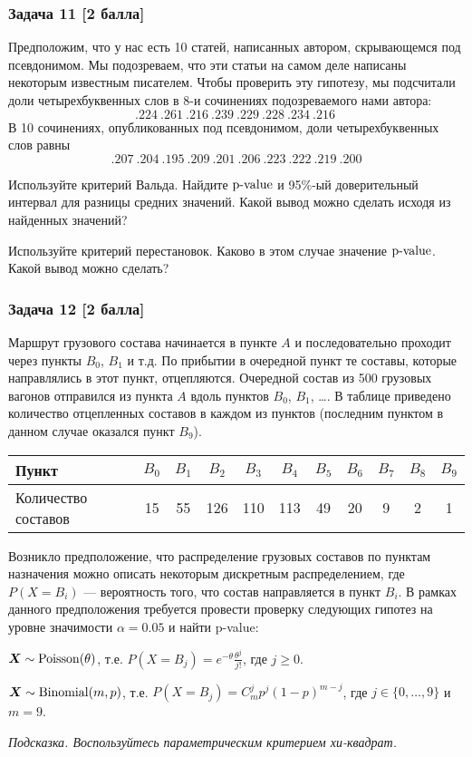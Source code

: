 \documentclass{article}
\renewenvironment{itemize}[1]{\begin{compactitem}#1}{\end{compactitem}}
\renewenvironment{enumerate}[1]{\begin{compactenum}#1}{\end{compactenum}}
\begin{document}
\subsubsection*{Задача 11 [2 балла]}
Предположим, что у нас есть 10 статей, написанных автором, скрывающемся под псевдонимом. Мы подозреваем, что эти статьи на самом деле написаны некоторым известным писателем. Чтобы проверить эту гипотезу, мы подсчитали доли четырехбуквенных слов в 8-и сочинениях подозреваемого нами автора:
$$
.224~ .261~ .216~ .239~ .229~ .228~ .234~ .216~
$$
В 10 сочинениях, опубликованных под псевдонимом, доли четырехбуквенных слов равны
$$
.207~ .204~ .195~ .209~ .201~ .206~ .223~ .222~ .219~ .200
$$
\begin{itemize}
	\item Используйте критерий Вальда. Найдите $\text{p-value}$ и 95\%-ый доверительный интервал для разницы средних значений. Какой вывод можно сделать исходя из найденных значений?
	\item Используйте критерий перестановок. Каково в этом случае значение $\text{p-value}$. Какой вывод можно сделать?
\end{itemize}


\subsubsection*{Задача 12 [2 балла]}
Маршрут грузового состава начинается в пункте $A$ и последовательно проходит через пункты $B_0$, $B_1$ и т.д. По прибытии в очередной пункт те составы, которые направлялись в этот пункт, отцепляются. Очередной состав из 500 грузовых вагонов отправился из пункта $A$ вдоль пунктов $B_0$, $B_1$, \dots. В таблице приведено количество отцепленных составов в каждом из пунктов (последним пунктом в данном случае оказался пункт $B_9$).

\begin{table}[!h]
	\centering
	\begin{tabular}{|l|c|c|c|c|c|c|c|c|c|c|}
		\hline
		Пункт & $B_0$  & $B_1$  & $B_2$   & $B_3$   & $B_4$   & $B_5$  & $B_6$  & $B_7$ & $B_8$ & $B_9$ \\ \hline
		Количество составов & 15 & 55 & 126 & 110 & 113 & 49 & 20 & 9 & 2 & 1 \\
		\hline
	\end{tabular}
\end{table}

Возникло предположение, что распределение грузовых составов по пунктам назначения можно описать некоторым дискретным распределением, где $P(X = B_i)$ --- вероятность того, что состав направляется в пункт $B_i$. В рамках данного предположения требуется провести проверку следующих гипотез на уровне значимости $\alpha = 0.05$ и найти p-value:
\begin{enumerate}
	\item $\boldsymbol{X} \sim \mathrm{Poisson}(\theta)$, т.е. $P(X = B_j) = e^{-\theta} \frac{\theta^j}{j!}$, где $j \ge 0$.
	\item $\boldsymbol{X} \sim \mathrm{Binomial}(m, p)$, т.е. $P(X = B_j) = C^j_m p^j (1-p)^{m - j}$, где $j \in \{0, \dots, 9\}$ и $m = 9$.
\end{enumerate}

\textit{Подсказка. Воспользуйтесь параметрическим критерием хи-квадрат.}
\end{document}
